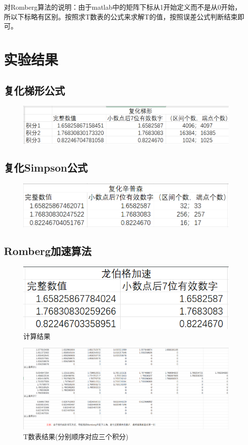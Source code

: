 \documentclass{LabReport}
\begin{document}
{\color{red} 对Romberg算法的说明：}由于matlab中的矩阵下标从1开始定义而不是从0开始，所以下标略有区别。按照求T数表的公式来求解T的值，按照误差公式判断结束即可。

\section{实验结果}

\subsection{复化梯形公式}	
\begin{figure}[h!]
	\centering
	\includegraphics[width=0.7\linewidth]{figures/1}
	\label{fig:1}
\end{figure}


\subsection{复化Simpson公式}
\begin{figure}[h!]
	\centering
	\includegraphics[width=0.7\linewidth]{figures/2}
	\label{fig:2}
\end{figure}

\subsection{Romberg加速算法}

\begin{figure}[h!]
	\centering
	\includegraphics[width=0.7\linewidth]{figures/3}
	\caption{计算结果}
	\label{fig:3}
\end{figure}

\begin{figure}[h!]
	\centering
	\includegraphics[width=1\linewidth]{figures/4}
	\caption{T数表结果(分别顺序对应三个积分)}
	\label{fig:4}
\end{figure}
\end{document}
